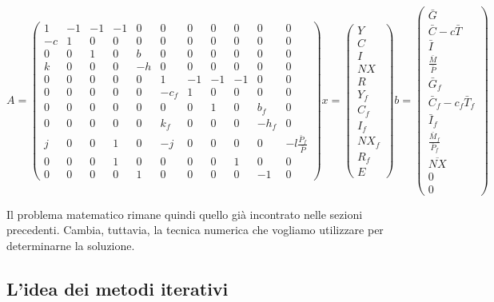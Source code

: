 \setcounter{MaxMatrixCols}{11}
\tiny
$$
A=\begin{pmatrix}
1&-1&-1&-1&0&0&0&0&0&0&0\\
-c&1&0&0&0&0&0&0&0&0&0\\
0&0&1&0&b&0&0&0&0&0&0\\
k&0&0&0&-h&0&0&0&0&0&0\\
0&0&0&0&0&1&-1&-1&-1&0&0\\
0&0&0&0&0&-c_f&1&0&0&0&0\\
0&0&0&0&0&0&0&1&0&b_f&0\\
0&0&0&0&0&k_f&0&0&0&-h_f&0\\
j&0&0&1&0&-j&0&0&0&0&-l\frac{\bar P_f}{\bar P}\\
0&0&0&1&0&0&0&0&1&0&0\\
0&0&0&0&1&0&0&0&0&-1&0
\end{pmatrix}
x=\begin{pmatrix}
Y\\ C\\ I\\ NX\\ R\\ Y_f\\ C_f\\ I_f\\ NX_f\\ R_f\\ E
\end{pmatrix}
b=\begin{pmatrix}
\bar G\\ \bar C-c\bar T\\ \bar I\\ \frac{\bar M}{\bar P}\\ \bar G_f\\ \bar C_f-c_f\bar T_f\\ \bar I_f\\ \frac{\bar M_f}{\bar P_f}\\ \overline{NX}\\ 0\\ 0
\end{pmatrix}
$$

\normalsize

Il problema matematico rimane quindi quello già incontrato nelle
sezioni precedenti. Cambia, tuttavia, la tecnica numerica che
vogliamo utilizzare per determinarne la soluzione.


\subsection{L'idea dei metodi iterativi}

